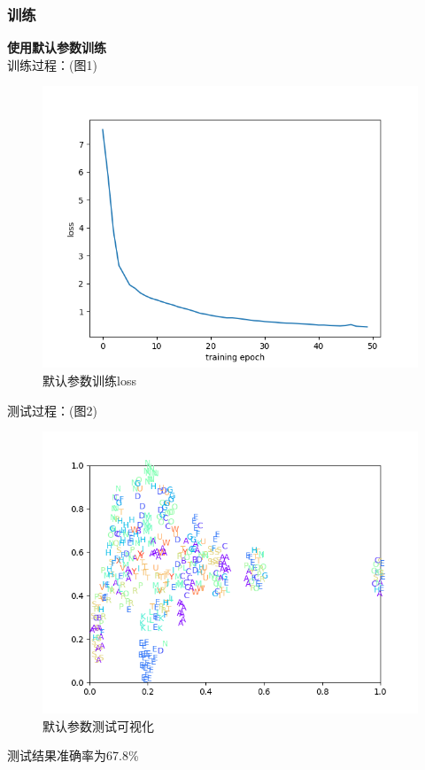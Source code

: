 \documentclass[a4paper]{article}
\begin{document}
\subsubsection{训练}
\textbf{使用默认参数训练}\\
训练过程：(图1)\\
\begin{figure}
    \centering
    \includegraphics[width=12cm]{Fig1.png}
    \caption{默认参数训练loss}
\end{figure}
测试过程：(图2)\\
\begin{figure}
    \centering
    \includegraphics[width=12cm]{Fig2.png}
    \caption{默认参数测试可视化}
\end{figure}
测试结果准确率为67.8\%
\end{document}

